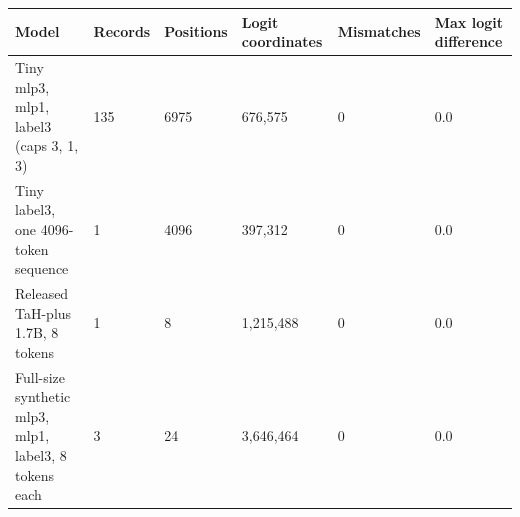 \begin{tabular}{llllll}
\toprule
Model & Records & Positions & Logit coordinates & Mismatches & Max logit difference \\
\midrule
Tiny mlp3, mlp1, label3 (caps 3, 1, 3) & 135 & 6975 & 676,575 & 0 & 0.0 \\
Tiny label3, one 4096-token sequence & 1 & 4096 & 397,312 & 0 & 0.0 \\
Released TaH-plus 1.7B, 8 tokens & 1 & 8 & 1,215,488 & 0 & 0.0 \\
Full-size synthetic mlp3, mlp1, label3, 8 tokens each & 3 & 24 & 3,646,464 & 0 & 0.0 \\
\bottomrule
\end{tabular}

